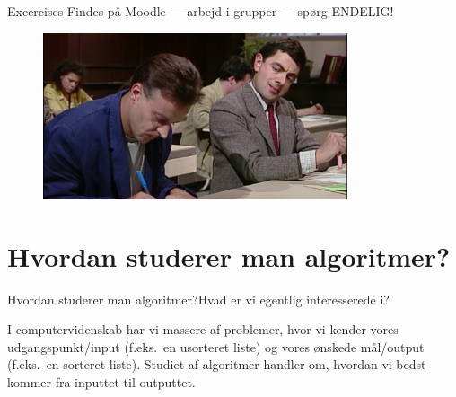 \documentclass[aspectratio=1610]{beamer}
\begin{document}
\begin{frame}{Excercises}{}
    Findes på Moodle --- arbejd i grupper --- spørg ENDELIG!

    \begin{figure}[h]
        \centering
        \includegraphics[width=0.8\textwidth]{exercises}
    \end{figure}
\end{frame}


\section{Hvordan studerer man algoritmer?}

\begin{frame}{Hvordan studerer man algoritmer?}{Hvad er vi egentlig
    interesserede i?}

    I computervidenskab har vi massere af problemer, hvor vi kender vores
    udgangspunkt/input (f.eks.\ en usorteret liste) og vores ønskede mål/output
    (f.eks.\ en sorteret liste). Studiet af algoritmer handler om, hvordan vi
    bedst kommer fra inputtet til outputtet.

\end{frame}
\end{document}
